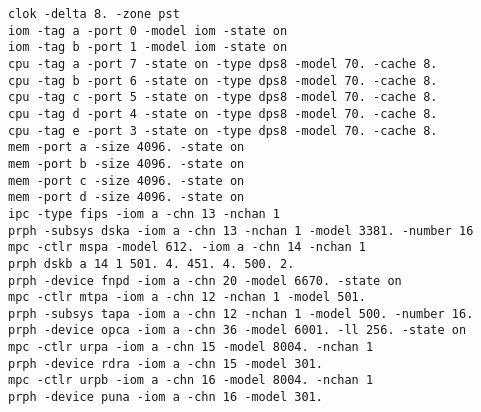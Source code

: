\begin{adjustwidth}{5ex}{1ex}
    \texttt{clok -delta 8. -zone pst} \\
    \texttt{iom  -tag a -port 0 -model iom -state on} \\
    \texttt{iom  -tag b -port 1 -model iom -state on} \\
    \texttt{cpu  -tag a -port 7 -state on -type dps8 -model 70. -cache 8.} \\
    \texttt{cpu  -tag b -port 6 -state on -type dps8 -model 70. -cache 8.} \\
    \texttt{cpu  -tag c -port 5 -state on -type dps8 -model 70. -cache 8.} \\
    \texttt{cpu  -tag d -port 4 -state on -type dps8 -model 70. -cache 8.} \\
    \texttt{cpu  -tag e -port 3 -state on -type dps8 -model 70. -cache 8.} \\
    \texttt{mem  -port a -size 4096. -state on} \\
    \texttt{mem  -port b -size 4096. -state on} \\
    \texttt{mem  -port c -size 4096. -state on} \\
    \texttt{mem  -port d -size 4096. -state on} \\
    \texttt{ipc  -type fips   -iom a -chn 13 -nchan 1} \\
    \texttt{prph -subsys dska -iom a -chn 13 -nchan 1 -model 3381. -number 16} \\
    \texttt{mpc -ctlr mspa -model 612. -iom a -chn 14 -nchan 1} \\
    \texttt{prph dskb a 14 1 501. 4. 451. 4. 500. 2.} \\
    \texttt{prph -device fnpd -iom a -chn 20 -model 6670. -state on} \\
    \texttt{mpc  -ctlr   mtpa -iom a -chn 12 -nchan 1 -model 501.} \\
    \texttt{prph -subsys tapa -iom a -chn 12 -nchan 1 -model 500. -number 16.} \\
    \texttt{prph -device opca -iom a -chn 36 -model 6001. -ll 256. -state on} \\
    \texttt{mpc  -ctlr   urpa -iom a -chn 15 -model 8004. -nchan 1} \\
    \texttt{prph -device rdra -iom a -chn 15 -model 301.} \\
    \texttt{mpc  -ctlr   urpb -iom a -chn 16 -model 8004. -nchan 1} \\
    \texttt{prph -device puna -iom a -chn 16 -model 301.} \\

\end{adjustwidth}
